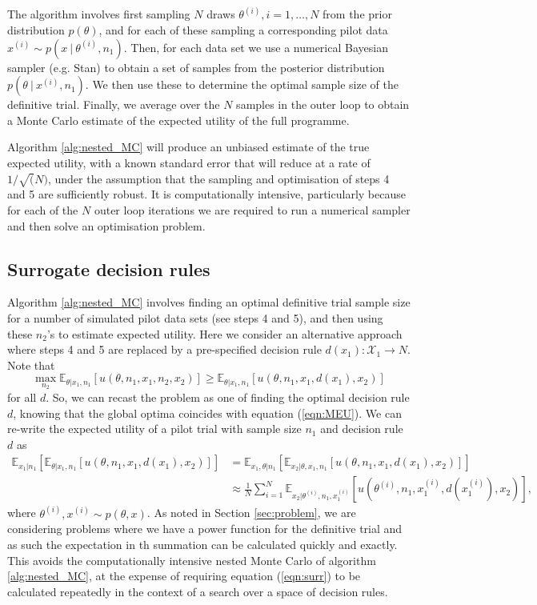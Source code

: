 \documentclass[sagev, Crown]{sagej} %
\begin{document}
The algorithm involves first sampling $N$ draws $\theta^{(i)}, i=1,\ldots,N$ from the prior distribution $p(\theta)$, and for each of these sampling a corresponding pilot data $x^{(i)} \sim p(x ~|~ \theta^{(i)}, n_1)$. Then, for each data set we use a numerical Bayesian sampler (e.g. Stan) to obtain a set of samples from the posterior distribution $p(\theta ~|~ x^{(i)}, n_1)$. We then use these to determine the optimal sample size of the definitive trial. Finally, we average over the $N$ samples in the outer loop to obtain a Monte Carlo estimate of the expected utility of the full programme.

Algorithm \ref{alg:nested_MC} will produce an unbiased estimate of the true expected utility, with a known standard error that will reduce at a rate of $1/\sqrt(N)$, under the assumption that the sampling and optimisation of steps 4 and 5 are sufficiently robust. It is computationally intensive,  particularly because for each of the $N$ outer loop iterations we are required to run a numerical sampler and then solve an optimisation problem.

\subsection{Surrogate decision rules}

Algorithm \ref{alg:nested_MC} involves finding an optimal definitive trial sample size for a number of simulated pilot data sets (see steps 4 and 5), and then using these $n_2$'s to estimate expected utility. Here we consider an alternative approach where steps 4 and 5 are replaced by a pre-specified decision rule $d(x_1): \mathcal{X}_1 \rightarrow N$. Note that
$$
\max_{n_2} \mathbb{E}_{\theta | x_1, n_1}[ u(\theta, n_1, x_1, n_2, x_2)] \geq \mathbb{E}_{\theta | x_1, n_1}[ u(\theta, n_1, x_1, d(x_1), x_2)] 
$$
for all $d$. So, we can recast the problem as one of finding the optimal decision rule $d$, knowing that the global optima coincides with equation (\ref{eqn:MEU}). We can re-write the expected utility of a pilot trial with sample size $n_1$ and decision rule $d$ as
\begin{align}\label{eqn:surr}
\mathbb{E}_{x_1 | n_1} \left[ \mathbb{E}_{\theta | x_1, n_1}[ u(\theta, n_1, x_1, d(x_1), x_2)] \right]
& = \mathbb{E}_{x_1, \theta | n_1} \left[ \mathbb{E}_{x_2 | \theta, x_1, n_1} [ u(\theta, n_1, x_1, d(x_1), x_2)] \right] \nonumber \\
& \approx \frac{1}{N} \sum_{i=1}^{N} \mathbb{E}_{x_2 | \theta^{(i)}, n_1, x_1^{(i)}}[ u(\theta^{(i)}, n_1, x_1^{(i)}, d(x_1^{(i)}), x_2) ],
\end{align}
where $\theta^{(i)}, x^{(i)} \sim p(\theta, x)$. As noted in Section \ref{sec:problem}, we are considering problems where we have a power function for the definitive trial and as such the expectation in th summation can be calculated quickly and exactly. This avoids the computationally intensive nested Monte Carlo of algorithm \ref{alg:nested_MC}, at the expense of requiring equation (\ref{eqn:surr}) to be calculated repeatedly in the context of a search over a space of decision rules.
\end{document}
